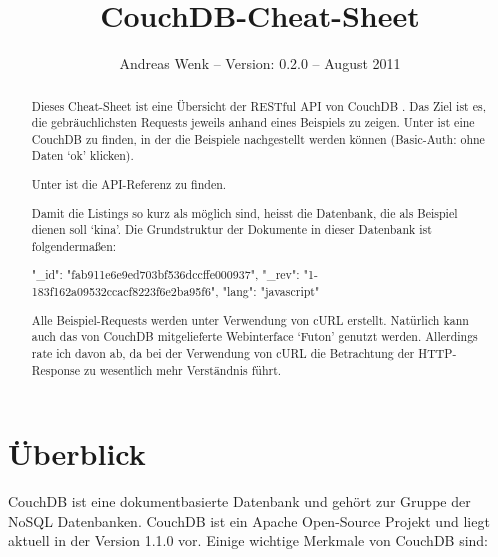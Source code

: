 \documentclass[19pt,landscape,twocolumn]{article}
\begin{document}
\fontsize{9}{10}\selectfont

\title{CouchDB-Cheat-Sheet}
\author{Andreas Wenk -- Version: 0.2.0 -- August 2011}
\date{}
\maketitle

\begin{abstract}
Dieses Cheat-Sheet ist eine Übersicht der RESTful API von CouchDB \cite{1}. Das Ziel ist es,
die gebräuchlichsten Requests jeweils anhand eines Beispiels zu zeigen. Unter \cite{2}
ist eine CouchDB zu finden, in der die Beispiele nachgestellt werden können (Basic-Auth: ohne
Daten `ok' klicken).

Unter \cite{3} ist die API-Referenz zu finden.

Damit die Listings so kurz als möglich sind, heisst die Datenbank, die als Beispiel dienen
soll `kina'. Die Grundstruktur der Dokumente in dieser Datenbank ist folgendermaßen:

\begin{code}
{
   "_id": "fab911e6e9ed703bf536dccffe000937",
   "_rev": "1-183f162a09532ccacf8223f6e2ba95f6",
   "lang": "javascript"
}
\end{code}

Alle Beispiel-Requests werden unter Verwendung von cURL \cite{10} erstellt. Natürlich kann auch das von
CouchDB mitgelieferte Webinterface `Futon' genutzt werden. Allerdings rate ich davon ab, da
bei der Verwendung von cURL die Betrachtung der HTTP-Response zu wesentlich mehr Verständnis führt.
\end{abstract}

\section{Überblick}

CouchDB ist eine dokumentbasierte Datenbank und gehört zur Gruppe der NoSQL Datenbanken. CouchDB
ist ein Apache Open-Source Projekt und liegt aktuell in der Version 1.1.0 vor. Einige wichtige
Merkmale von CouchDB sind:
\end{document}
